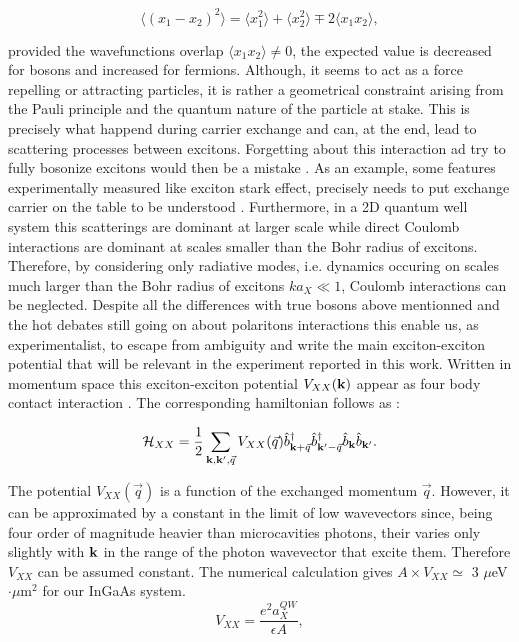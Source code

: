 \begin{equation}
    \langle(x_1-x_2)^2\rangle = \langle x_1^2\rangle + \langle x_2^2\rangle \mp 2\langle x_1x_2\rangle ,
\end{equation}

provided the wavefunctions overlap $\langle x_1x_2\rangle\neq0$, the expected value is decreased for bosons and increased for fermions. Although, it seems to act 
as a force repelling or attracting particles, it is rather a geometrical constraint arising from the Pauli principle and the quantum nature of the particle at stake.
This is precisely what happend during carrier exchange and can, at the end, lead to scattering processes between excitons. Forgetting about this interaction ad try to fully bosonize excitons would then be a mistake \cite{ciuti_carrier_exchanges_1998}.
As an example, some features experimentally measured like exciton stark effect, precisely needs to put exchange carrier on the table to be understood \cite{exciton_stark_VonLehmen_86,exciton_stark_Mysyrowicz_86,joffre_m_subpicosecond_1987}.
Furthermore, in a 2D quantum well system this scatterings are dominant at larger scale while direct Coulomb interactions are dominant at scales smaller than the Bohr radius of
excitons. Therefore, by considering only radiative modes, i.e. dynamics occuring on scales much larger than the Bohr radius of
excitons $ka_X\ll 1$, Coulomb interactions can be neglected. Despite all the differences with true bosons above mentionned and the hot debates still going on about polaritons interactions \cite{Combescot_2007_exact_pol_pol_interactions,I_frerot_PRX_2023} this enable us, as experimentalist, to escape from ambiguity and write the main exciton-exciton potential that 
will be relevant in the experiment reported in this work. Written in momentum space this exciton-exciton potential $V_{XX}(\mathbf{k})$ appear as four body contact interaction \cite{Rochat2000}. The corresponding hamiltonian follows as :


\begin{equation}
    \mathcal{H}_{XX} = \dfrac{1}{2}\sum_{\mathbf{k}, \mathbf{k}', \vec{q}} V_{XX}(\vec{q}) \hat{b}^\dagger_{\mathbf{k}+\vec{q}} \hat{b}^\dagger_{\mathbf{k}'-\vec{q}} \hat{b}_{\mathbf{k}} \hat{b}_{\mathbf{k}'}.
\label{exciton_interaction_ham}
\end{equation}

The potential $V_{XX}(\vec{q})$ is a function of the exchanged momentum $\vec{q}$. However, it can be approximated by a constant in the limit of low wavevectors since, being four order of magnitude heavier than microcavities photons, their varies only slightly with $\mathbf{k}$ in the range of the photon wavevector that excite them. Therefore $V_{XX}$ can be assumed constant. The numerical calculation gives $A \times V_{XX}\simeq$ 3 $\mu$eV$\cdot \mu$m$^{2}$ for our InGaAs system.
\begin{equation}
    V_{XX} = \dfrac{e^2 a_X^{QW}}{\epsilon A},
\end{equation}

